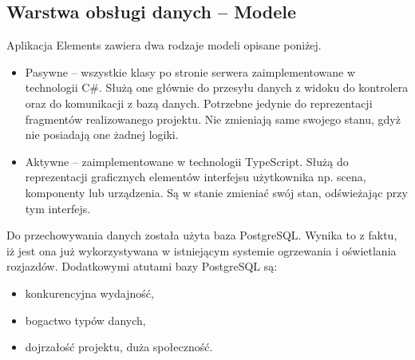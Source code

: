 \subsection{Warstwa obsługi danych -- Modele}
Aplikacja Elements zawiera dwa rodzaje modeli opisane poniżej.
\begin{itemize}
\item Pasywne -- wszystkie klasy po stronie serwera zaimplementowane w technologii C\#. Służą one głównie do przesyłu danych z widoku do kontrolera oraz do komunikacji z bazą danych. Potrzebne jedynie do reprezentacji fragmentów realizowanego projektu. Nie zmieniają same swojego stanu, gdyż nie posiadają one żadnej logiki. 
\item Aktywne -- zaimplementowane w technologii TypeScript. Służą do reprezentacji graficznych elementów interfejsu użytkownika np. scena, komponenty lub urządzenia. Są w stanie zmieniać swój stan, odświeżając przy tym interfejs.
\end{itemize}

Do przechowywania danych została użyta baza PostgreSQL. Wynika to z faktu, iż jest ona już wykorzystywana w istniejącym systemie ogrzewania i oświetlania rozjazdów. Dodatkowymi atutami bazy PostgreSQL są\cite{postgresql-book}:
\begin{itemize}
\item konkurencyjna wydajność,
\item bogactwo typów danych,
\item dojrzałość projektu, duża społeczność.
\end{itemize}

